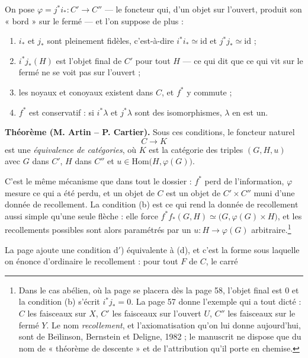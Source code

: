\documentclass[11pt,a4paper]{article}
\begin{document}
On pose $\varphi = j^{*} i_{*} : C' \to C''$ — le foncteur qui, d'un objet sur
l'ouvert, produit son « bord » sur le fermé — et l'on suppose de plus :

\begin{enumerate}
\item[(a)] $i_{*}$ et $j_{*}$ sont pleinement fidèles, c'est-à-dire
$i^{*}i_{*} \simeq \mathrm{id}$ et $j^{*}j_{*} \simeq \mathrm{id}$ ;
\item[(b)] $i^{*}j_{*}(H)$ est l'objet final de $C'$ pour tout $H$ — ce qui
dit que ce qui vit sur le fermé ne se voit pas sur l'ouvert ;
\item[(c)] les noyaux et conoyaux existent dans $C$, et $f^{*}$ y commute ;
\item[(d)] $f^{*}$ est conservatif : si $i^{*}\lambda$ et $j^{*}\lambda$ sont
des isomorphismes, $\lambda$ en est un.
\end{enumerate}

\textbf{Théorème (M. Artin -- P. Cartier).} Sous ces conditions, le foncteur
naturel
\[
  C \longrightarrow K
\]
est une \emph{équivalence de catégories}, où $K$ est la catégorie des triples
$(G, H, u)$ avec $G$ dans $C'$, $H$ dans $C''$ et
$u \in \mathrm{Hom}\bigl( H, \varphi(G) \bigr)$.

C'est le même mécanisme que dans tout le dossier : $f^{*}$ perd de
l'information, $\varphi$ mesure ce qui a été perdu, et un objet de $C$ est un
objet de $C' \times C''$ muni d'une donnée de recollement. La condition (b) est
ce qui rend la donnée de recollement aussi simple qu'une seule flèche : elle
force $f^{*}f_{*}(G,H) \simeq \bigl( G, \varphi(G) \times H \bigr)$, et les
recollements possibles sont alors paramétrés par un $u : H \to \varphi(G)$
arbitraire.\footnote{Dans le cas abélien, où la page se placera dès la page 58,
l'objet final est $0$ et la condition (b) s'écrit $i^{*}j_{*} = 0$. La page 57
donne l'exemple qui a tout dicté : $C$ les faisceaux sur $X$, $C'$ les
faisceaux sur l'ouvert $U$, $C''$ les faisceaux sur le fermé $Y$. Le nom
\emph{recollement}, et l'axiomatisation qu'on lui donne aujourd'hui, sont de
Beĭlinson, Bernstein et Deligne, 1982 ; le manuscrit ne dispose que du nom de
« théorème de descente » et de l'attribution qu'il porte en chemise.}

La page ajoute une condition d$'$) équivalente à (d), et c'est la forme sous
laquelle on énonce d'ordinaire le recollement : pour tout $F$ de $C$, le carré

\end{document}
